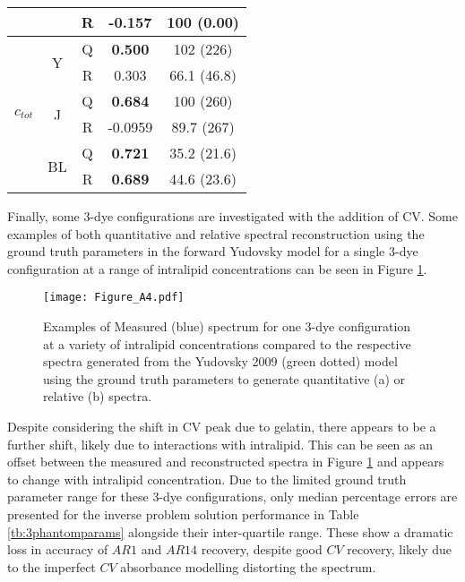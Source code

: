 \begin{table}[htbp]
\begin{tabular}{|ccc|cc|}
        & & R & -0.157 & 100 (0.00) \\
        \hline
        \multirow{6}{*}{$c_{tot}$} & \multirow{2}{*}{Y} & Q &  \textbf{0.500} & 102 (226) \\
        & & R & 0.303 & 66.1 (46.8) \\
        \cline{2-5}
        & \multirow{2}{*}{J} & Q & \textbf{0.684} & 100 (260) \\
        & & R & -0.0959 & 89.7 (267)\\
        \cline{2-5}
        & \multirow{2}{*}{BL} & Q & \textbf{0.721} & 35.2 (21.6) \\
        & & R & \textbf{0.689} & 44.6 (23.6)\\
        \hline
    \end{tabular}
    \label{tb:phantomparams}
\end{table}

Finally, some 3-dye configurations are investigated with the addition of CV. Some examples of both quantitative and relative spectral reconstruction using the ground truth parameters in the forward Yudovsky model for a single 3-dye configuration at a range of intralipid concentrations can be seen in Figure \ref{ap:3phantomforwards}. 

\begin{figure}[htb!]
    \centering
    \texttt{[image: Figure\_A4.pdf]}
    \caption{Examples of Measured (blue) spectrum for one 3-dye configuration at a variety of intralipid concentrations compared to the respective spectra generated from the Yudovsky 2009 (green dotted) model using the ground truth parameters to generate quantitative (a) or relative (b) spectra.}
 \label{ap:3phantomforwards}
\end{figure}

Despite considering the shift in CV peak due to gelatin, there appears to be a further shift, likely due to interactions with intralipid. This can be seen as an offset between the measured and reconstructed spectra in Figure \ref{ap:3phantomforwards} and appears to change with intralipid concentration. Due to the limited ground truth parameter range for these 3-dye configurations, only median percentage errors are presented for the inverse problem solution performance in Table \ref{tb:3phantomparams} alongside their inter-quartile range. These show a dramatic loss in accuracy of $AR1$ and $AR14$ recovery, despite good $CV$ recovery, likely due to the imperfect $CV$ absorbance modelling distorting the spectrum. 

